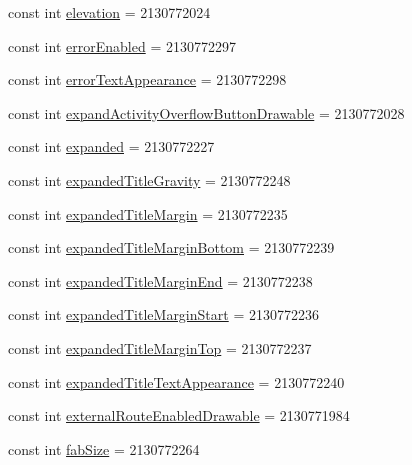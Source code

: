 \begin{CompactItemize}
\item 
const int \hyperlink{class__2doo_1_1_droid_1_1_resource_1_1_attribute_a0f13493b732502e9f402fe9f63756b3}{elevation} = 2130772024
\item 
const int \hyperlink{class__2doo_1_1_droid_1_1_resource_1_1_attribute_d177eb52edf5753a1661c1b0e62bb7a0}{errorEnabled} = 2130772297
\item 
const int \hyperlink{class__2doo_1_1_droid_1_1_resource_1_1_attribute_7e9b40f542ce13f50ea230ecf1bf0845}{errorTextAppearance} = 2130772298
\item 
const int \hyperlink{class__2doo_1_1_droid_1_1_resource_1_1_attribute_8fa8cf9a73f72726da2b3c2950be6f1e}{expandActivityOverflowButtonDrawable} = 2130772028
\item 
const int \hyperlink{class__2doo_1_1_droid_1_1_resource_1_1_attribute_3d6a70053946d87ea3f8112cbfc72e4d}{expanded} = 2130772227
\item 
const int \hyperlink{class__2doo_1_1_droid_1_1_resource_1_1_attribute_f1bceb0be4a99c934962358777e46359}{expandedTitleGravity} = 2130772248
\item 
const int \hyperlink{class__2doo_1_1_droid_1_1_resource_1_1_attribute_0187310d83d44914ff5741386392bc7d}{expandedTitleMargin} = 2130772235
\item 
const int \hyperlink{class__2doo_1_1_droid_1_1_resource_1_1_attribute_c54b0be9edb87c5721c0d90d71eed313}{expandedTitleMarginBottom} = 2130772239
\item 
const int \hyperlink{class__2doo_1_1_droid_1_1_resource_1_1_attribute_c61c388a0b32b6ee42d64defd40fc11d}{expandedTitleMarginEnd} = 2130772238
\item 
const int \hyperlink{class__2doo_1_1_droid_1_1_resource_1_1_attribute_101a9c8a6be35d67018dafbca6499b06}{expandedTitleMarginStart} = 2130772236
\item 
const int \hyperlink{class__2doo_1_1_droid_1_1_resource_1_1_attribute_98b70823b487deacbfbb5173ae1753a1}{expandedTitleMarginTop} = 2130772237
\item 
const int \hyperlink{class__2doo_1_1_droid_1_1_resource_1_1_attribute_21e0aaa8a3bf820c844f683fe54e8208}{expandedTitleTextAppearance} = 2130772240
\item 
const int \hyperlink{class__2doo_1_1_droid_1_1_resource_1_1_attribute_187cdf9d6b5eb2890137fe6797436132}{externalRouteEnabledDrawable} = 2130771984
\item 
const int \hyperlink{class__2doo_1_1_droid_1_1_resource_1_1_attribute_52413d18999c6dd224d5d6ade41d899b}{fabSize} = 2130772264

\end{CompactItemize}
